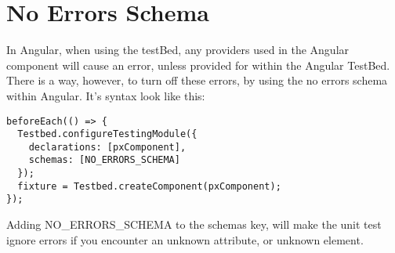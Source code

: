 \maketitle{}
\section{ No Errors Schema }

In Angular, when using the testBed, any providers used in the Angular component
will cause an error, unless provided for within the Angular TestBed. There is a
way, however, to turn off these errors, by using the no errors schema within
Angular. It's syntax look like this:
\begin{lstlisting}
beforeEach(() => {
  Testbed.configureTestingModule({
    declarations: [pxComponent],
    schemas: [NO_ERRORS_SCHEMA]
  });
  fixture = Testbed.createComponent(pxComponent);
});
\end{lstlisting}

Adding NO_ERRORS_SCHEMA to the schemas key, will make the unit test ignore
errors if you encounter an unknown attribute, or unknown element. 

